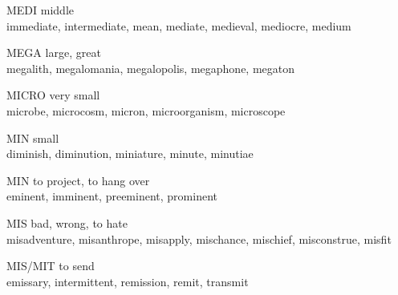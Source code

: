 \begin{flashcard}[Roots]{MEDI}
middle\\
\vspace{0.2in}
immediate, intermediate, mean, mediate, medieval, mediocre, medium\\
\end{flashcard}

\begin{flashcard}[Roots]{MEGA}
large, great\\
\vspace{0.2in}
megalith, megalomania, megalopolis, megaphone, megaton\\
\end{flashcard}

\begin{flashcard}[Roots]{MICRO}
very small\\
\vspace{0.2in}
microbe, microcosm, micron, microorganism, microscope\\
\end{flashcard}

\begin{flashcard}[Roots]{MIN}
small\\
\vspace{0.2in}
diminish, diminution, miniature, minute, minutiae\\
\end{flashcard}

\begin{flashcard}[Roots]{MIN}
to project, to hang over\\
\vspace{0.2in}
eminent, imminent, preeminent, prominent\\
\end{flashcard}

\begin{flashcard}[Roots]{MIS}
bad, wrong, to hate\\
\vspace{0.2in}
misadventure, misanthrope, misapply, mischance, mischief, misconstrue, misfit\\
\end{flashcard}

\begin{flashcard}[Roots]{MIS/MIT}
to send\\
\vspace{0.2in}
emissary, intermittent, remission, remit, transmit\\
\end{flashcard}

